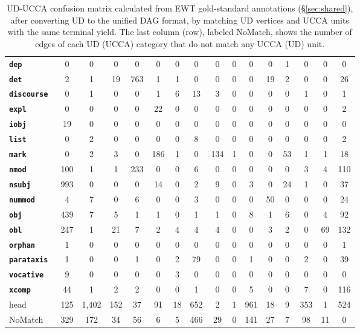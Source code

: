 \documentclass[11pt,a4paper]{article}
\begin{document}
\begin{table}[t]
\begin{tabular}{l|cccccccccccccc|c}
\bf \tt \tiny dep & 0 & 0 & 0 & 0 & 0 & 0 & 0 & 0 & 0 & 0 & 0 & 1 & 0 & 0 & 0 \\
\bf \tt \tiny det & 2 & 1 & 19 & 763 & 1 & 1 & 0 & 0 & 0 & 0 & 19 & 2 & 0 & 0 & 26 \\
\bf \tt \tiny discourse & 0 & 1 & 0 & 0 & 1 & 6 & 13 & 3 & 0 & 0 & 0 & 0 & 1 & 0 & 1 \\
\bf \tt \tiny expl & 0 & 0 & 0 & 0 & 22 & 0 & 0 & 0 & 0 & 0 & 0 & 0 & 0 & 0 & 2 \\
\bf \tt \tiny iobj & 19 & 0 & 0 & 0 & 0 & 0 & 0 & 0 & 0 & 0 & 0 & 0 & 0 & 0 & 0 \\
\bf \tt \tiny list & 0 & 2 & 0 & 0 & 0 & 0 & 8 & 0 & 0 & 0 & 0 & 0 & 0 & 0 & 2 \\
\bf \tt \tiny mark & 0 & 2 & 3 & 0 & 186 & 1 & 0 & 134 & 1 & 0 & 0 & 53 & 1 & 1 & 18 \\
\bf \tt \tiny nmod & 100 & 1 & 1 & 233 & 0 & 0 & 6 & 0 & 0 & 0 & 0 & 0 & 3 & 4 & 110 \\
\bf \tt \tiny nsubj & 993 & 0 & 0 & 0 & 14 & 0 & 2 & 9 & 0 & 3 & 0 & 24 & 1 & 0 & 37 \\
\bf \tt \tiny nummod & 4 & 7 & 0 & 6 & 0 & 0 & 3 & 0 & 0 & 0 & 50 & 0 & 0 & 0 & 24 \\
\bf \tt \tiny obj & 439 & 7 & 5 & 1 & 1 & 0 & 1 & 1 & 0 & 8 & 1 & 6 & 0 & 4 & 92 \\
\bf \tt \tiny obl & 247 & 1 & 21 & 7 & 2 & 4 & 4 & 4 & 0 & 0 & 3 & 2 & 0 & 69 & 132 \\
\bf \tt \tiny orphan & 1 & 0 & 0 & 0 & 0 & 0 & 0 & 0 & 0 & 0 & 0 & 0 & 0 & 0 & 1 \\
\bf \tt \tiny parataxis & 1 & 0 & 0 & 1 & 0 & 2 & 79 & 0 & 0 & 1 & 0 & 0 & 2 & 0 & 39 \\
\bf \tt \tiny vocative & 9 & 0 & 0 & 0 & 0 & 3 & 0 & 0 & 0 & 0 & 0 & 0 & 0 & 0 & 0 \\
\bf \tt \tiny xcomp & 44 & 1 & 2 & 2 & 0 & 0 & 1 & 0 & 0 & 5 & 0 & 0 & 7 & 0 & 116 \\
\hline
head & 125 & 1,402 & 152 & 37 & 91 & 18 & 652 & 2 & 1 & 961 & 18 & 9 & 353 & 1 & 524 \\
\sc NoMatch & 329 & 172 & 34 & 56 & 6 & 5 & 466 & 29 & 0 & 141 & 27 & 7 & 98 & 11 & 0
\end{tabular}
\caption{UD-UCCA confusion matrix calculated from EWT
gold-standard annotations (\S\ref{sec:shared}),
after converting UD to the unified DAG format,
by matching UD vertices and UCCA units with the same terminal yield.
The last column (row), labeled {\sc NoMatch}, shows the number of edges of each UD (UCCA) category
that do not match any UCCA (UD) unit.
\label{tab:confusion_matrix}}
\end{table}
\end{document}
